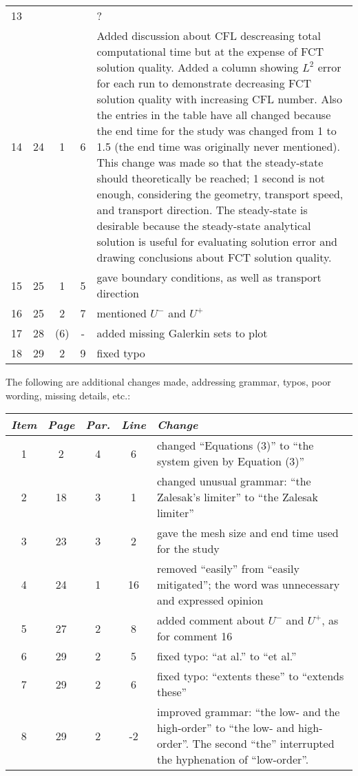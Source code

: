 \begin{tabular}{c c c c p{3in}}
13 & & & & ?\\
14 & 24 & 1 & 6 & Added discussion about CFL descreasing total computational time
  but at the expense of FCT solution quality. Added a column showing $L^2$ error
  for each run to demonstrate decreasing FCT solution quality with increasing
  CFL number. Also the entries in the table have all changed because the end
  time for the study was changed from 1 to 1.5 (the end time was originally never mentioned).
  This change was made so that the steady-state should theoretically be reached; 1 second
  is not enough, considering the geometry, transport speed, and transport direction.
  The steady-state is desirable because the steady-state analytical solution is
  useful for evaluating solution error and drawing conclusions about FCT solution quality.\\
15 & 25 & 1 & 5 & gave boundary conditions, as well as transport direction\\
16 & 25 & 2 & 7 & mentioned $U^-$ and $U^+$\\
17 & 28 & (6) & - & added missing Galerkin sets to plot\\
18 & 29 & 2 & 9 & fixed typo\\
\end{tabular}

The following are additional changes made, addressing grammar, typos, poor
wording, missing details, etc.:

\begin{tabular}{c c c c p{3in}}
\emph{Item} & \emph{Page} & \emph{Par.} & \emph{Line} & \emph{Change}\\\hline
1 & 2 & 4 & 6 & changed ``Equations (3)'' to ``the system given by Equation (3)''\\
2 & 18 & 3 & 1 & changed unusual grammar: ``the Zalesak's limiter'' to ``the Zalesak limiter''\\
3 & 23 & 3 & 2 & gave the mesh size and end time used for the study\\
4 & 24 & 1 & 16 & removed ``easily'' from ``easily mitigated''; the word was unnecessary and expressed opinion\\
5 & 27 & 2 & 8 & added comment about $U^-$ and $U^+$, as for comment 16\\
6 & 29 & 2 & 5 & fixed typo: ``at al.'' to ``et al.''\\
7 & 29 & 2 & 6 & fixed typo: ``extents these'' to ``extends these''\\
8 & 29 & 2 & -2 & improved grammar: ``the low- and the high-order'' to ``the low- and high-order''.
  The second ``the'' interrupted the hyphenation of ``low-order''.\\
\end{tabular}


